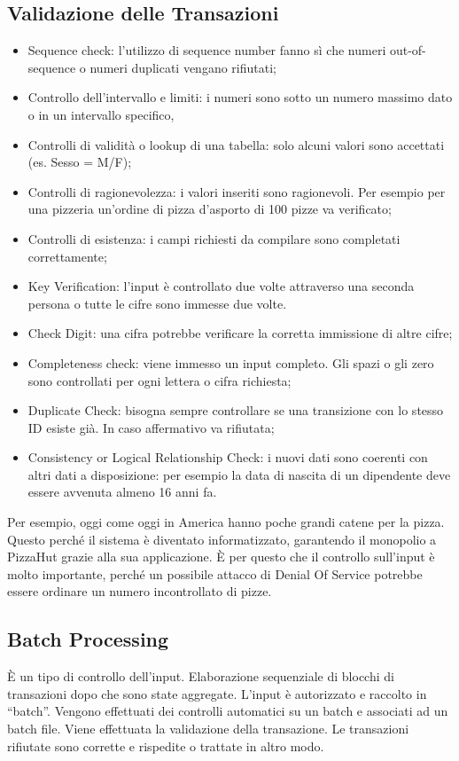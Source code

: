 \subsection{Validazione delle Transazioni}
\begin{itemize}
	\item Sequence check: l'utilizzo di sequence number fanno sì che numeri
	out-of-sequence o numeri duplicati vengano rifiutati;
	\item Controllo dell'intervallo e limiti: i numeri sono sotto un numero
	massimo dato o in un intervallo specifico,
	\item Controlli di validità o lookup di una tabella:
	solo alcuni valori sono accettati (es. Sesso = M/F);
	\item Controlli di ragionevolezza: i valori inseriti sono ragionevoli.
	Per esempio per una pizzeria un'ordine di pizza d'asporto di 100 pizze
	va verificato;
	\item Controlli di esistenza: i campi richiesti da compilare
	sono completati correttamente;
	\item Key Verification: l'input è controllato due volte attraverso
	una seconda persona o tutte le cifre sono immesse due volte.
	\item Check Digit: una cifra potrebbe verificare la corretta
	immissione di altre cifre;
	\item Completeness check: viene immesso un input completo. Gli
	spazi o gli zero sono controllati per ogni lettera o cifra
	richiesta;
	\item Duplicate Check: bisogna sempre controllare se una transizione
	con lo stesso ID esiste già. In caso affermativo va rifiutata;
	\item Consistency or Logical Relationship Check: i nuovi dati
	sono coerenti con altri dati a disposizione: per esempio
	la data di nascita di un dipendente deve essere avvenuta almeno
	16 anni fa.
\end{itemize}

Per esempio, oggi come oggi in America hanno poche grandi catene per la pizza.
Questo perché il sistema è diventato informatizzato, garantendo il monopolio a
PizzaHut grazie alla sua applicazione. È per questo che il controllo
sull'input è molto importante, perché un possibile attacco di Denial Of
Service potrebbe essere ordinare un numero incontrollato di pizze.





\subsection{Batch Processing}
È un tipo di controllo dell'input.
Elaborazione sequenziale di blocchi di transazioni
dopo che sono state aggregate.
L'input è autorizzato e raccolto in ``batch''. Vengono effettuati
dei controlli automatici su un batch e associati ad un batch file.
Viene effettuata la validazione della transazione. Le transazioni
rifiutate sono corrette e rispedite o trattate in altro modo.

